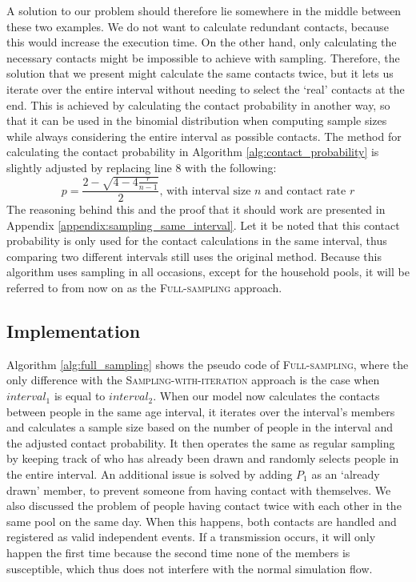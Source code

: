 A solution to our problem should therefore lie somewhere in the middle between these two examples. We do not want to calculate redundant contacts, because this would increase the execution time. On the other hand, only calculating the necessary contacts might be impossible to achieve with sampling. Therefore, the solution that we present might calculate the same contacts twice, but it lets us iterate over the entire interval without needing to select the `real' contacts at the end. This is achieved by calculating the contact probability in another way, so that it can be used in the binomial distribution when computing sample sizes while always considering the entire interval as possible contacts. The method for calculating the contact probability in Algorithm \ref{alg:contact_probability} is slightly adjusted by replacing line 8 with the following:
$$p = \frac{2-\sqrt{4-4\frac{r}{n-1}}}{2}\text{, with interval size }n\text{ and contact rate }r$$
The reasoning behind this and the proof that it should work are presented in Appendix \ref{appendix:sampling_same_interval}. Let it be noted that this contact probability is only used for the contact calculations in the same interval, thus comparing two different intervals still uses the original method. Because this algorithm uses sampling in all occasions, except for the household pools, it will be referred to from now on as the \textsc{Full-sampling} approach.

\subsection{Implementation}
\label{subsec:implementation_full_sampling}
Algorithm \ref{alg:full_sampling} shows the pseudo code of \textsc{Full-sampling}, where the only difference with the \textsc{Sampling-with-iteration} approach is the case when $interval_{1}$ is equal to $interval_{2}$. When our model now calculates the contacts between people in the same age interval, it iterates over the interval's members and calculates a sample size based on the number of people in the interval and the adjusted contact probability. It then operates the same as regular sampling by keeping track of who has already been drawn and randomly selects people in the entire interval. An additional issue is solved by adding $P_{1}$ as an `already drawn' member, to prevent someone from having contact with themselves. We also discussed the problem of people having contact twice with each other in the same pool on the same day. When this happens, both contacts are handled and registered as valid independent events. If a transmission occurs, it will only happen the first time because the second time none of the members is susceptible, which thus does not interfere with the normal simulation flow.


